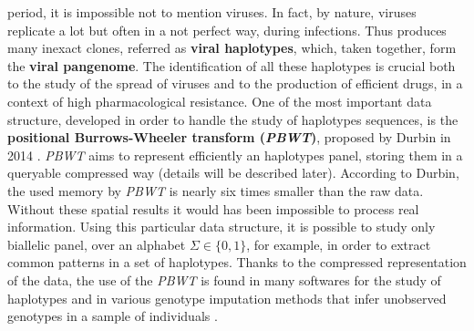 \documentclass[a4paper,11pt, oneside]{article}
\newcommand{\pb}[1]{\todo{\textbf{PB} #1}}
\newcommand{\dc}[1]{\todo{\textbf{DC} #1}}
\begin{document}
period, it is impossible not to mention viruses. In fact, by nature, viruses
replicate a lot but often in a not perfect way, during infections. Thus produces
many inexact clones, referred as \textbf{viral haplotypes}, which, taken
together, form the \textbf{viral pangenome}. The identification of all these
haplotypes is crucial both to the study of the spread of viruses and to the
production of efficient drugs, in a context of high pharmacological resistance.
One of the most important data structure, developed in order to handle the study
of haplotypes sequences, is the \textbf{positional Burrows-Wheeler transform
  (\textit{PBWT})}, proposed by Durbin in 2014 \cite{pbwt_durbin}. \textit{PBWT}
aims to represent efficiently an haplotypes panel, storing them in a queryable
compressed way (details will be described later). According to Durbin, the used
memory by \textit{PBWT} is nearly six times smaller than the raw data. Without
these spatial results it would has been impossible to process real information.
Using this particular data structure, it is
possible to study only biallelic panel, over an alphabet $\Sigma\in\{0,1\}$, for
example, in order to extract common patterns in a set of haplotypes. Thanks to
the compressed representation of the 
data, the use of the \textit{PBWT} is found in many 
softwares for the study of haplotypes and in various genotype imputation methods
that infer unobserved genotypes in a sample of individuals \cite{impute5}.
\end{document}
